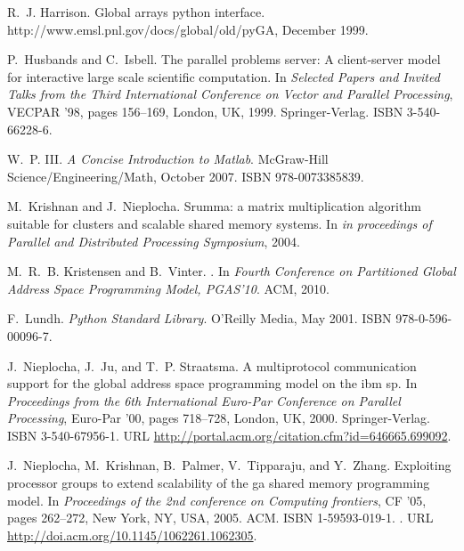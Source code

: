 \documentclass{sigplanconf}
\begin{document}
\begin{thebibliography}{36}
R.~J. Harrison.
\newblock Global arrays python interface.
\newblock http://www.emsl.pnl.gov/docs/global/old/pyGA, December 1999.

P.~Husbands and C.~Isbell.
\newblock The parallel problems server: A client-server model for interactive
  large scale scientific computation.
\newblock In \emph{Selected Papers and Invited Talks from the Third
  International Conference on Vector and Parallel Processing}, VECPAR '98,
  pages 156--169, London, UK, 1999. Springer-Verlag.
\newblock ISBN 3-540-66228-6.

\vfill\eject

W.~P. III.
\newblock \emph{A Concise Introduction to Matlab}.
\newblock McGraw-Hill Science/Engineering/Math, October 2007.
\newblock ISBN 978-0073385839.

M.~Krishnan and J.~Nieplocha.
\newblock Srumma: a matrix multiplication algorithm suitable for clusters and
  scalable shared memory systems.
\newblock In \emph{in proceedings of Parallel and Distributed Processing
  Symposium}, 2004.

M.~R.~B. Kristensen and B.~Vinter.
.
\newblock In \emph{Fourth Conference on Partitioned Global Address Space
  Programming Model, PGAS{'}10}. ACM, 2010.

F.~Lundh.
\newblock \emph{Python Standard Library}.
\newblock O'Reilly Media, May 2001.
\newblock ISBN 978-0-596-00096-7.

J.~Nieplocha, J.~Ju, and T.~P. Straatsma.
\newblock A multiprotocol communication support for the global address space
  programming model on the ibm sp.
\newblock In \emph{Proceedings from the 6th International Euro-Par Conference
  on Parallel Processing}, Euro-Par '00, pages 718--728, London, UK, 2000.
  Springer-Verlag.
\newblock ISBN 3-540-67956-1.
\newblock URL \url{http://portal.acm.org/citation.cfm?id=646665.699092}.

J.~Nieplocha, M.~Krishnan, B.~Palmer, V.~Tipparaju, and Y.~Zhang.
\newblock Exploiting processor groups to extend scalability of the ga shared
  memory programming model.
\newblock In \emph{Proceedings of the 2nd conference on Computing frontiers},
  CF '05, pages 262--272, New York, NY, USA, 2005{}. ACM.
\newblock ISBN 1-59593-019-1.
\newblock {}.
\newblock URL \url{http://doi.acm.org/10.1145/1062261.1062305}.


\end{thebibliography}
\end{document}
